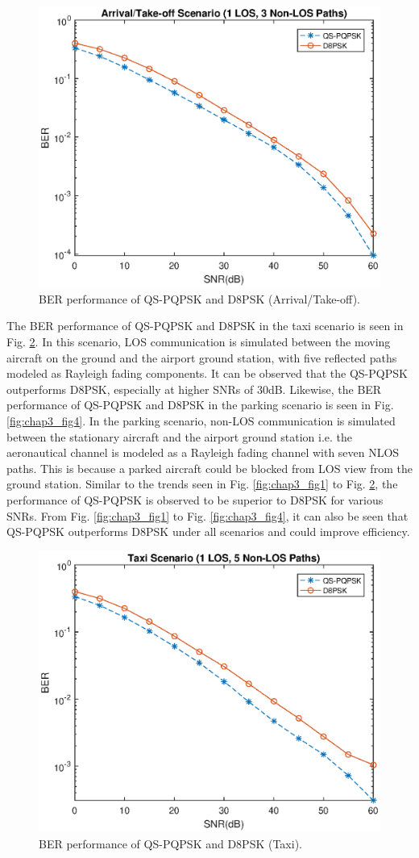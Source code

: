 \begin{figure} []
\centering
\includegraphics [width=0.5\columnwidth]{chap3_fig/chap3_fig2.eps} 
\caption{BER performance of QS-PQPSK and D8PSK (Arrival/Take-off).}
\label{fig:chap3_fig2}
\end{figure}

The BER performance of QS-PQPSK and D8PSK in the taxi scenario is seen in Fig. \ref{fig:chap3_fig3}. In this scenario, LOS communication is simulated between the moving aircraft on the ground and the airport ground station, with five reflected paths modeled as Rayleigh fading components. It can be observed that the QS-PQPSK outperforms D8PSK, especially at higher SNRs of 30dB. Likewise, the BER performance of QS-PQPSK and D8PSK in the parking scenario is seen in Fig. \ref{fig:chap3_fig4}. In the parking scenario, non-LOS communication is simulated between the stationary aircraft and the airport ground station i.e. the aeronautical channel is modeled as a Rayleigh fading channel with seven NLOS paths. This is because a parked aircraft could be blocked from LOS view from the ground station. Similar to the trends seen in Fig. \ref{fig:chap3_fig1} to Fig. \ref{fig:chap3_fig3}, the performance of QS-PQPSK is observed to be superior to D8PSK for various SNRs. From Fig. \ref{fig:chap3_fig1} to Fig. \ref{fig:chap3_fig4}, it can also be seen that QS-PQPSK outperforms D8PSK under all scenarios and could improve efficiency.

\begin{figure} []
\centering
\includegraphics [width=0.5\columnwidth]{chap3_fig/chap3_fig3.eps} 
\caption{BER performance of QS-PQPSK and D8PSK (Taxi).}
\label{fig:chap3_fig3}
\end{figure}

